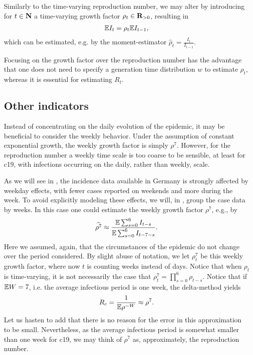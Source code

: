 Similarly to the time-varying reproduction number, we may alter  by introducing for $t \in \mathbf N$ a time-varying growth factor $\rho_{t} \in \mathbf R_{> 0}$, resulting in 
\begin{align}
    \label{eq:exponential-growth-time-varying}
    \mathbb E I_{t} = \rho_t \mathbb E I_{t - 1},
\end{align}
which can be estimated, e.g. by the moment-estimator $\hat \rho_{t} = \frac{I_{t}}{I_{t - 1}}$. 

Focusing on the growth factor over the reproduction number has the advantage that one does not need to specify a generation time distribution $w$ to estimate $\rho_{t}$, whereas it is essential for estimating $R_{t}$. 

\subsection{Other indicators}
\label{subsec:other_indicat}
Instead of concentrating on the daily evolution of the epidemic, it may be beneficial to consider the weekly behavior. Under the assumption of constant exponential growth, the weekly growth factor is simply $\rho^{7}$. However, for the reproduction number a weekly time scale is too coarse to be sensible, at least for \acrshort{c19}, with infections occurring on the daily, rather than weekly, scale.

As we will see in , the incidence data available in Germany is strongly affected by weekday effects, with fewer cases reported on weekends and more during the week. To avoid explicitly modeling these effects, we will, in , group the case data by weeks. In this case one could estimate the weekly growth factor $\rho^{7}$, e.g., by
\begin{align}
    \label{eq:rho7_smooth}
    \widehat{\rho^{7}} \approx \frac{ \mathbb E \sum_{s = 0}^{6} I_{t - s}}{\mathbb E \sum_{s = 0}^6 I_{t - 7 - s}}.
\end{align}
Here we assumed, again, that the circumstances of the epidemic do not change over the period considered. By slight abuse of notation, we let $\rho^{7}_t$ be this weekly growth factor, where now $t$ is counting weeks instead of days. Notice that when $\rho_{t}$ is time-varying, it is not necessarily the case that $\rho^{7}_t = \prod_{s = 0}^{6} \rho_{t - s}$. Notice that if $\mathbb E W = 7$, i.e. the average infectious period is one week, the delta-method yields 
$$
    R_{c} = \frac{1}{\mathbb E \rho^{-W}} \approx \rho^{7}.
$$
Let us hasten to add that there is no reason for the error in this approximation to be small. Nevertheless, as the average infectious period is somewhat smaller than one week for \acrshort{c19}, we may think of $\rho^{7}$ as, approximately, the reproduction number.

